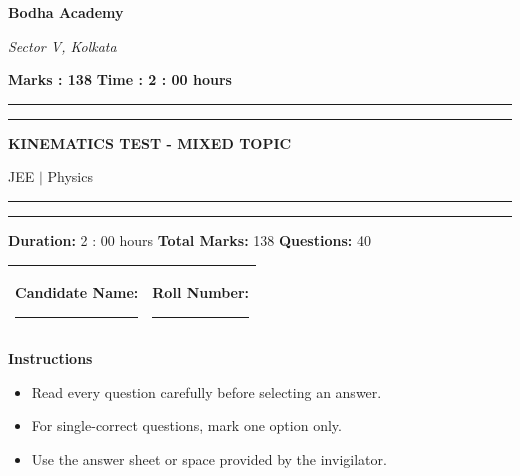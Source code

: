 \documentclass[11pt,a4paper]{article}
\begin{document}
{\centering \large \textbf{Bodha Academy}\par}
{\centering \small \textit{Sector V, Kolkata}\par}
\vspace{2mm}
\noindent \textbf{Marks : 138} \hfill \textbf{Time : 2 : 00 hours}
\noindent\rule{\linewidth}{1.1pt}\vspace{-1mm}\noindent\rule{\linewidth}{0.5pt}
{\centering \Large \textbf{KINEMATICS TEST - MIXED TOPIC}\par}
{\centering JEE $|$ Physics\par}
\noindent\rule{\linewidth}{1.1pt}\vspace{-1mm}\noindent\rule{\linewidth}{0.5pt}
\vspace{1mm}
\noindent \textbf{Duration:} 2 : 00 hours \quad \textbf{Total Marks:} 138 \quad \textbf{Questions:} 40\par
\vspace{2mm}

\begin{tabularx}{\linewidth}{|X|X|}\hline
Candidate Name: \rule{6cm}{0.4pt} & Roll Number: \rule{3.5cm}{0.4pt} \\\hline
\end{tabularx}

\textbf{Instructions}
\begin{itemize}[topsep=2pt]
\item Read every question carefully before selecting an answer.
\item For single-correct questions, mark one option only.
\item Use the answer sheet or space provided by the invigilator.
\end{itemize}
\end{document}
